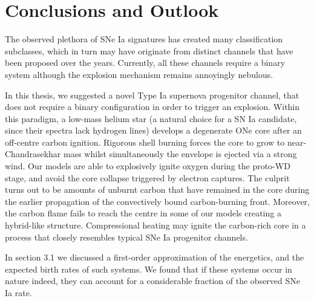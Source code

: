\documentclass[../../main/thesis_msc.tex]{subfiles}
\begin{document}
	\chapter{Conclusions and Outlook}
	
		The observed plethora of SNe Ia signatures has created many classification subclasses, which in turn may have originate from distinct channels that have been proposed over the years. Currently, all these channels require a binary system although the explosion mechanism remains annoyingly nebulous. 


		In this thesis, we suggested a novel Type Ia supernova progenitor channel, that does not require a binary configuration in order to trigger an explosion. Within this paradigm, a low-mass helium star (a natural choice for a SN Ia candidate, since their spectra lack hydrogen lines) develops a degenerate ONe core after an off-centre carbon ignition. Rigorous shell burning forces the core to grow to near-Chandrasekhar mass whilst simultaneously the envelope is ejected via a strong wind. Our models are able to explosively ignite oxygen during the proto-WD stage, and avoid the core collapse triggered by electron captures. The culprit turns out to be amounts of unburnt carbon that have remained in the core during the earlier propagation of the convectively bound carbon-burning front.
		Moreover, the carbon flame fails to reach the centre in some of our models creating a hybrid-like structure. Compressional heating may ignite the carbon-rich core in a process that closely resembles typical SNe Ia progenitor channels.
		
		
		In section 3.1 we discussed a first-order approximation of the energetics, and the expected birth rates of such systems. We found that if these systems occur in nature indeed, they can account for a considerable fraction of the observed SNe Ia rate.
		
		
		 
	
		
\end{document}
